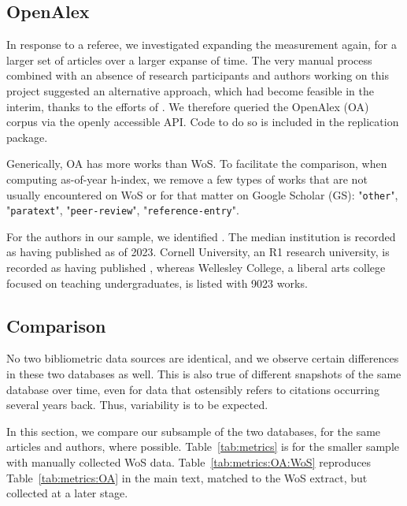 \documentclass{cje_appendix} %
\theoremstyle{plain}%
\theoremstyle{definition}
\theoremstyle{remark}
\begin{document}
\subsection{OpenAlex}

In response to a referee, we investigated expanding the measurement again, for a larger set of articles over a larger expanse of time. The very manual process combined with an absence of research participants and authors working on this project suggested an alternative approach, which had become feasible in the interim, thanks to the efforts of \cite{openalex2022}. We therefore queried the OpenAlex (OA) corpus \citep{ourresearch2023} via the openly accessible \ac{API}. Code to do so is included in the replication package. 

Generically, OA has more works than WoS. To facilitate the comparison, when computing as-of-year h-index, we remove a few types of works that are not usually encountered on WoS or for that matter on Google Scholar (GS): "\texttt{other}", "\texttt{paratext}", "\texttt{peer-review}", "\texttt{reference-entry}". 

For the  authors in our sample, we identified . The median institution is recorded as having published  as of 2023. Cornell University, an R1 research university, is recorded as having published , whereas Wellesley College, a liberal arts college focused on teaching undergraduates, is listed with 9023 works. 

\subsection{Comparison}

No two bibliometric data sources are identical, and we observe certain differences in these two databases as well. This is also true of different snapshots of the same database over time, even for data that ostensibly refers to citations occurring several years back. Thus, variability is to be expected. 

In this section, we compare our subsample of the two databases, for the same articles and authors, where possible. Table~\ref{tab:metrics} is for the smaller sample with manually collected WoS data. Table~\ref{tab:metrics:OA:WoS} reproduces Table~\ref{tab:metrics:OA} in the main text, matched to the WoS extract, but collected at a later stage.
\end{document}
